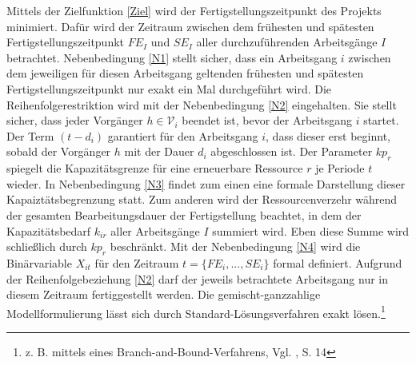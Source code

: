 \documentclass[a4paper,12pt,parskip,bibtotoc,liststotoc]{article}
\begin{document}
Mittels der Zielfunktion \eqref{Ziel} wird der Fertigstellungszeitpunkt des Projekts minimiert. Dafür wird der Zeitraum zwischen dem frühesten und spätesten Fertigstellungszeitpunkt $FE_{I}$ und $SE_{I}$ aller durchzuführenden Arbeitsgänge $I$ betrachtet. Nebenbedingung \eqref{N1} stellt sicher, dass ein Arbeitsgang $i$ zwischen dem jeweiligen für diesen Arbeitsgang geltenden frühesten und spätesten Fertigstellungszeitpunkt nur exakt ein Mal durchgeführt wird. Die Reihenfolgerestriktion wird mit der Nebenbedingung \eqref{N2} eingehalten. Sie stellt sicher, dass jeder Vorgänger $h \in \mathcal{V}_{i}$ beendet ist, bevor der Arbeitsgang $i$ startet. Der Term $(t - d_{i})$ garantiert für den Arbeitsgang $i$, dass dieser erst beginnt, sobald der Vorgänger $h$ mit der Dauer $d_{i}$ abgeschlossen ist.
Der Parameter $kp_{r}$ spiegelt die Kapazitätsgrenze für eine erneuerbare Ressource $r$ je Periode $t$ wieder. In Nebenbedingung \eqref{N3} findet zum einen eine formale Darstellung dieser Kapaiztätsbegrenzung statt. Zum anderen wird der Ressourcenverzehr während der gesamten Bearbeitungsdauer der Fertigstellung beachtet, in dem der Kapazitätsbedarf $k_{ir}$ aller Arbeitsgänge $I$ summiert wird. Eben diese Summe wird schließlich durch $kp_{r}$ beschränkt. %
Mit der Nebenbedingung \eqref{N4} wird die Binärvariable $X_{it}$ für den Zeitraum $t = \{FE_{i},...,SE_{i}\}$ formal definiert. Aufgrund der Reihenfolgebeziehung \eqref{N2} darf der jeweils betrachtete Arbeitsgang nur in diesem Zeitraum fertiggestellt werden.
Die gemischt-ganzzahlige Modellformulierung lässt sich durch Standard-Lösungsverfahren exakt lösen.\footnote{z. B. mittels eines Branch-and-Bound-Verfahrens, Vgl. \cite{kellenbrink2014einfuhrung}, S. 14}
\end{document}
